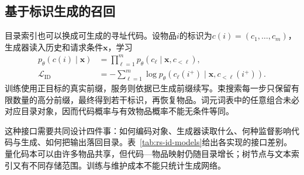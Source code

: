 \subsection{基于标识生成的召回}
\label{sec:rs-identifier-retrieval}

目录索引也可以换成可生成的寻址代码。设物品$i$的标识为$c(i)=(c_1,\ldots,c_m)$，生成器读入历史和请求条件$\bm x$，学习
\begin{equation}
 \begin{aligned}
 p_\theta(c(i)\mid\bm x)
 &=\prod_{\ell=1}^m p_\theta(c_\ell\mid\bm x,c_{<\ell}),\\
 \mathcal L_{\mathrm{ID}}
 &=-\sum_{\ell=1}^m\log p_\theta(c_\ell(i^+)\mid\bm x,c_{<\ell}(i^+)).
 \end{aligned}
 \label{eq:rs-id-generation}
\end{equation}
训练使用正目标的真实前缀，服务则依据已生成前缀续写。束搜索每一步只保留有限数量的高分前缀，最终得到若干标识，再恢复物品。词元词表中的任意组合未必对应目录对象，因而代码概率与有效物品概率不能无条件等同。

这种接口需要共同设计四件事：如何编码对象、生成器读取什么、何种监督影响代码与生成、如何把输出落回目录。表~\ref{tab:rs-id-models}给出各实现的接口差别。量化码本可以由许多物品共享，但代码—物品映射仍随目录增长；树节点与文本索引又有不同存储范围。训练与维护成本不能只统计生成网络。

